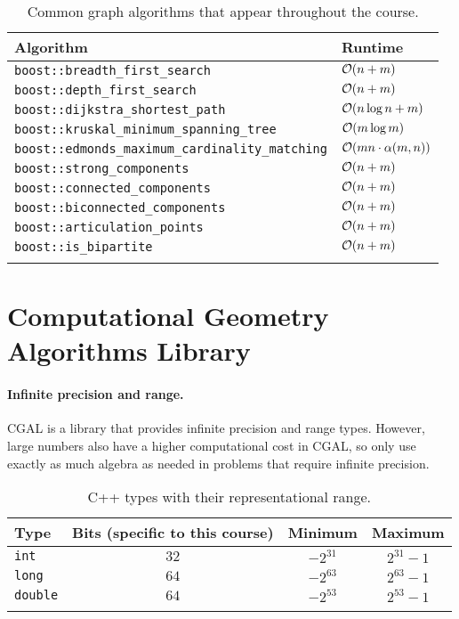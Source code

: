 \documentclass[justified,nobib]{tufte-handout}
\begin{document}
\begin{table}[h]
  \centering
  \caption{Common graph algorithms that appear throughout the course.}
  \label{tab:graph-algos}
  \begin{tabular}{ll} \toprule
    Algorithm & Runtime \\
    \midrule
    \texttt{boost::breadth\_first\_search} & $\bigo{n+m}$ \\
    \texttt{boost::depth\_first\_search} & $\bigo{n+m}$ \\
    \texttt{boost::dijkstra\_shortest\_path} & $\bigo{n\log n + m}$ \\
    \texttt{boost::kruskal\_minimum\_spanning\_tree} & $\bigo{m\log m}$ \\
    \texttt{boost::edmonds\_maximum\_cardinality\_matching} & $\bigo{mn\cdot\alpha(m,n)}$ \\
    \texttt{boost::strong\_components} & $\bigo{n+m}$ \\
    \texttt{boost::connected\_components} & $\bigo{n+m}$ \\
    \texttt{boost::biconnected\_components} & $\bigo{n+m}$ \\
    \texttt{boost::articulation\_points} & $\bigo{n+m}$ \\
    \texttt{boost::is\_bipartite} & $\bigo{n+m}$ \\
    \bottomrule \\
  \end{tabular}
\end{table}

\section{Computational Geometry Algorithms Library}

\paragraph{Infinite precision and range.}

CGAL is a library that provides infinite precision and range types. However, large numbers
also have a higher computational cost in CGAL, so only use exactly as much
algebra as needed in problems that require infinite precision.

\begin{table}[h]
  \centering
  \caption{C++ types with their representational range.}
  \label{tab:types}
  \begin{tabular}{lccc} \toprule
    Type & Bits (specific to this course) & Minimum & Maximum \\
    \midrule
    \texttt{int} & $32$ & $-2^{31}$ & $2^{31}-1$ \\
    \texttt{long} & $64$ & $-2^{63}$ & $2^{63}-1$ \\
    \texttt{double} & $64$ & $-2^{53}$ & $2^{53}-1$ \\
    \bottomrule \\
  \end{tabular}
\end{table}
\end{document}
